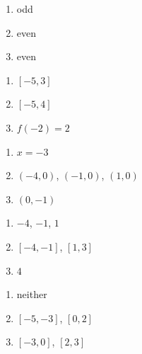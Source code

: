 \begin{multicols}{3}
\begin{enumerate}
\setcounter{enumi}{\value{HW}}

\item odd
\item even
\item even

\setcounter{HW}{\value{enumi}}
\end{enumerate}
\end{multicols}


\begin{multicols}{3}
\begin{enumerate}
\setcounter{enumi}{\value{HW}}

\item  $[-5,3]$
\item  $[-5,4]$
\item  $f(-2) = 2$

\setcounter{HW}{\value{enumi}}
\end{enumerate}
\end{multicols}

\begin{multicols}{3}
\begin{enumerate}
\setcounter{enumi}{\value{HW}}

\item  $x=-3$
\item $(-4,0)$, $(-1,0)$, $(1,0)$
\item  $(0,-1)$

\setcounter{HW}{\value{enumi}}
\end{enumerate}
\end{multicols}

\begin{multicols}{3}
\begin{enumerate}
\setcounter{enumi}{\value{HW}}

\item  $-4$, $-1$, $1$
\item  $[-4,-1]$, $[1,3]$
\item  $4$

\setcounter{HW}{\value{enumi}}
\end{enumerate}
\end{multicols}

\begin{multicols}{3}
\begin{enumerate}
\setcounter{enumi}{\value{HW}}

\item  neither
\item  $[-5,-3]$, $[0,2]$
\item  $[-3,0]$, $[2,3]$

\setcounter{HW}{\value{enumi}}
\end{enumerate}
\end{multicols}

